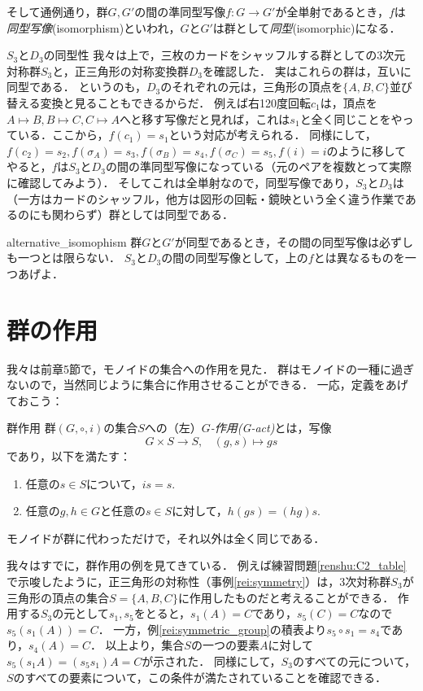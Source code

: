 \documentclass[11pt,a4paper, dvipdfmx]{jsarticle}
\begin{document}
そして通例通り，群$G, G'$の間の準同型写像$f:G \to G'$が全単射であるとき，$f$は\emph{同型写像}(isomorphism)といわれ，$G$と$G'$は群として\emph{同型}(isomorphic)になる．

\begin{rei}{$S_3$と$D_3$の同型性}{}
    我々は上で，三枚のカードをシャッフルする群としての3次元対称群$S_3$と，正三角形の対称変換群$D_3$を確認した．
    実はこれらの群は，互いに同型である．
    というのも，$D_3$のそれぞれの元は，三角形の頂点を$\{A, B, C\}$並び替える変換と見ることもできるからだ．
    例えば右120度回転$c_1$は，頂点を$A \mapsto B, B \mapsto C, C \mapsto A$へと移す写像だと見れば，これは$s_1$と全く同じことをやっている．ここから，$f(c_1) = s_1$という対応が考えられる．
    同様にして，$f(c_2) = s_2, f(\sigma_A)=s_3, f(\sigma_B) = s_4, f(\sigma_C) = s_5, f(i)=i$のように移してやると，$f$は$S_3$と$D_3$の間の準同型写像になっている（元のペアを複数とって実際に確認してみよう）．
    そしてこれは全単射なので，同型写像であり，$S_3$と$D_3$は（一方はカードのシャッフル，他方は図形の回転・鏡映という全く違う作業であるのにも関わらず）群としては同型である．
\end{rei}    

\begin{renshu}{}{alternative_isomophism}
    群$G$と$G'$が同型であるとき，その間の同型写像は必ずしも一つとは限らない．
    $S_3$と$D_3$の間の同型写像として，上の$f$とは異なるものを一つあげよ．
\end{renshu}

\section{群の作用}
我々は前章5節で，モノイドの集合への作用を見た．
群はモノイドの一種に過ぎないので，当然同じように集合に作用させることができる．
一応，定義をあげておこう：
\begin{dfn}{群作用}{}
    群$(G, \circ, i)$の集合$S$への（左）\emph{$G$-作用(G-act)}とは，写像
    \[
     G \times S \to S, \ \ \ \ (g, s) \mapsto gs
    \]
    であり，以下を満たす：
    \begin{enumerate}
     \item 任意の$s \in S$について，$is = s$.
     \item 任意の$g, h \in G$と任意の$s \in S$に対して，$h(gs) = (hg)s$.
    \end{enumerate}
\end{dfn}
モノイドが群に代わっただけで，それ以外は全く同じである．

我々はすでに，群作用の例を見てきている．
例えば練習問題\ref{renshu:C2_table}で示唆したように，正三角形の対称性（事例\ref{rei:symmetry}）は，3次対称群$S_3$が三角形の頂点の集合$S = \{A, B, C\}$に作用したものだと考えることができる．
作用する$S_3$の元として$s_1, s_5$をとると，$s_1(A)=C$であり，$s_5(C)=C$なので$s_5 (s_1 (A)) = C$．
一方，例\ref{rei:symmetric_group}の積表より$s_5 \circ s_1 = s_4$であり，$s_4(A)=C$．
以上より，集合$S$の一つの要素$A$に対して$s_5(s_1 A) = (s_5 s_1)A = C$が示された．
同様にして，$S_3$のすべての元について，$S$のすべての要素について，この条件が満たされていることを確認できる．
\end{document}
